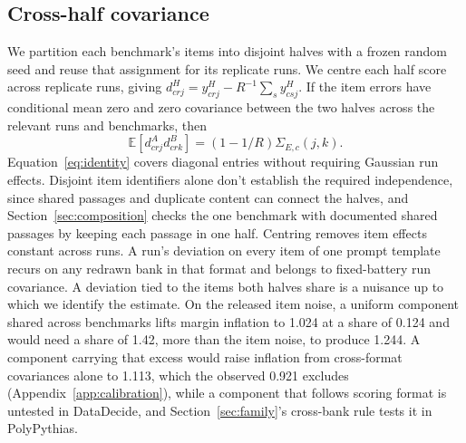 \subsection{Cross-half covariance}
We partition each benchmark's items into disjoint halves with a frozen random seed and reuse that assignment for its replicate runs. We centre each half score across replicate runs, giving $d^H_{crj}=y^H_{crj}-R^{-1}\sum_s y^H_{csj}$. If the item errors have conditional mean zero and zero covariance between the two halves across the relevant runs and benchmarks, then
\begin{equation}
\mathbb{E}[d^A_{crj}d^B_{crk}]=(1-1/R)\Sigma_{E,c}(j,k).
\label{eq:identity}
\end{equation}
Equation~\ref{eq:identity} covers diagonal entries without requiring Gaussian run effects. Disjoint item identifiers alone don't establish the required independence, since shared passages and duplicate content can connect the halves, and Section~\ref{sec:composition} checks the one benchmark with documented shared passages by keeping each passage in one half. Centring removes item effects constant across runs. A run's deviation on every item of one prompt template recurs on any redrawn bank in that format and belongs to fixed-battery run covariance. A deviation tied to the items both halves share is a nuisance up to which we identify the estimate. On the released item noise, a uniform component shared across benchmarks lifts margin inflation to 1.024 at a share of 0.124 and would need a share of 1.42, more than the item noise, to produce 1.244. A component carrying that excess would raise inflation from cross-format covariances alone to 1.113, which the observed 0.921  excludes (Appendix~\ref{app:calibration}), while a component that follows scoring format is untested in DataDecide, and Section~\ref{sec:family}'s cross-bank rule tests it in PolyPythias.

